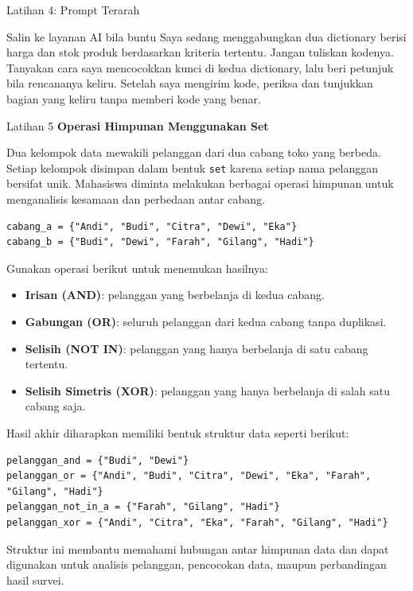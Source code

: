 \documentclass[aspectratio=169, table]{beamer}
\begin{document}
\begin{frame}{Latihan 4: Prompt Terarah}
\begin{block}{Salin ke layanan AI bila buntu}
\small Saya sedang menggabungkan dua dictionary berisi harga dan stok produk berdasarkan kriteria tertentu. Jangan tuliskan kodenya. Tanyakan cara saya mencocokkan kunci di kedua dictionary, lalu beri petunjuk bila rencananya keliru. Setelah saya mengirim kode, periksa dan tunjukkan bagian yang keliru tanpa memberi kode yang benar.
\end{block}
\end{frame}

\begin{frame}[fragile,allowframebreaks=0.8]{Latihan 5}
\footnotesize
\textbf{Operasi Himpunan Menggunakan Set}\par\medskip
Dua kelompok data mewakili pelanggan dari dua cabang toko yang berbeda. 
Setiap kelompok disimpan dalam bentuk \texttt{set} karena setiap nama pelanggan bersifat unik.  
Mahasiswa diminta melakukan berbagai operasi himpunan untuk menganalisis kesamaan dan perbedaan antar cabang.

\begin{lstlisting}[style=PythonStyle, breaklines=true]
cabang_a = {"Andi", "Budi", "Citra", "Dewi", "Eka"}
cabang_b = {"Budi", "Dewi", "Farah", "Gilang", "Hadi"}
\end{lstlisting}

Gunakan operasi berikut untuk menemukan hasilnya:
\begin{itemize}
  \item \textbf{Irisan (AND)}: pelanggan yang berbelanja di kedua cabang.
  \item \textbf{Gabungan (OR)}: seluruh pelanggan dari kedua cabang tanpa duplikasi.
  \item \textbf{Selisih (NOT IN)}: pelanggan yang hanya berbelanja di satu cabang tertentu.
  \item \textbf{Selisih Simetris (XOR)}: pelanggan yang hanya berbelanja di salah satu cabang saja.
\end{itemize}

Hasil akhir diharapkan memiliki bentuk struktur data seperti berikut:

\begin{lstlisting}[style=PythonStyle, breaklines=true]
pelanggan_and = {"Budi", "Dewi"}
pelanggan_or = {"Andi", "Budi", "Citra", "Dewi", "Eka", "Farah", "Gilang", "Hadi"}
pelanggan_not_in_a = {"Farah", "Gilang", "Hadi"}
pelanggan_xor = {"Andi", "Citra", "Eka", "Farah", "Gilang", "Hadi"}
\end{lstlisting}

Struktur ini membantu memahami hubungan antar himpunan data dan dapat digunakan untuk 
analisis pelanggan, pencocokan data, maupun perbandingan hasil survei.
\end{frame}
\end{document}
